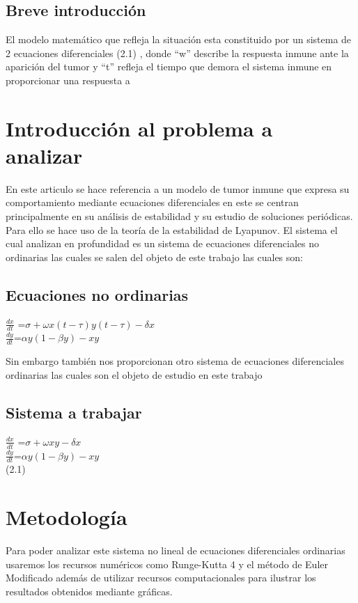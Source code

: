 \documentclass{article}
\begin{document}
   \subsection*{Breve introducción}
   El modelo matemático que refleja la situación esta constituido por
    un sistema de 2 ecuaciones diferenciales (2.1) , donde “w”
     describe la respuesta inmune ante la aparición del tumor y “t” refleja 
     el tiempo que demora el sistema inmune en proporcionar una respuesta a 
    
\section{Introducción al problema a analizar}
\noindent En este articulo se hace referencia a un modelo de tumor inmune que expresa su comportamiento mediante 
 ecuaciones diferenciales en este se centran principalmente en su análisis de estabilidad y su estudio de
    soluciones periódicas. Para ello se hace uso de la teoría de la estabilidad de Lyapunov.
     El sistema el cual analizan en 
    profundidad es un sistema de ecuaciones diferenciales no ordinarias las cuales se 
    salen del objeto de este trabajo las cuales son:
    \centering
    \subsection*{Ecuaciones no ordinarias}
      $\frac{d x}{d t} $ =$\sigma + \omega x(t- \tau )y(t- \tau )-
        \delta x
        $
        \\
        $\frac{d y}{d t}$=$\alpha y(1-\beta y)-xy$



Sin embargo también nos proporcionan otro sistema de ecuaciones diferenciales ordinarias las
 cuales son el objeto de estudio 
en este trabajo 
\centering
   \subsection*{Sistema a trabajar}
        $\frac{d x}{d t} $ =$\sigma + \omega xy-
            \delta x
            $
            \\
            $\frac{d y}{d t}$=$\alpha y(1-\beta y)-xy$
      \\(2.1)
\section{Metodología}
\noindent 
  Para poder analizar este sistema no lineal de ecuaciones diferenciales ordinarias usaremos los 
  recursos numéricos como Runge-Kutta 4 y el método de Euler Modificado además
   de utilizar recursos computacionales para ilustrar los resultados obtenidos mediante
  gráficas.
  
\end{document}
